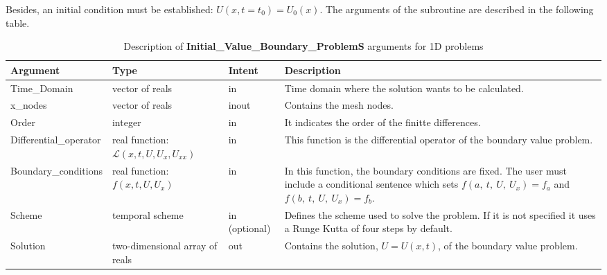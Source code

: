 Besides, an initial condition must be established: $U(x,t = t_0) = U_0 (x)$.
The arguments of the subroutine are described in the following table.

\begin{table}[H]
	\begin{center}
		\begin{spacing}{1.2}
			\begin{tabular}{| l | p{3cm}| l | p{5.5cm} |}
				
				\hline
				
				\bf Argument & \bf Type & \bf Intent & \bf Description \\ \hline \hline
				
				Time\_Domain & vector of reals & in &  Time domain where the solution wants to be calculated.  \\ \hline
				
				x\_nodes & vector of reals & inout &  Contains the mesh nodes.  \\ \hline
				
				Order &  integer  & in & It indicates the order of the finitte differences.  \\ \hline
				
				Differential\_operator & \raggedright real function: $\mathscr{L}\left(x, t, U,  U_x,  U_{xx} \right)$ & in  & This function is the differential operator of the boundary value problem.   \\ \hline
				
				Boundary\_conditions & \raggedright real function: $f\left(x, t, U,  U_x \right)$  & in &  In this function, the boundary conditions are fixed. The user must include a conditional sentence which sets $f\left(a, \ t, \ U, \ U_x \right) = f_a$ and $f\left(b,\ t, \ U, \ U_x \right) = f_b$.  \\ \hline
				
				Scheme & temporal scheme  & in (optional) & Defines the scheme used to solve the problem. If it is not specified it uses a Runge Kutta of four steps by default.    \\ \hline
				
				Solution & two-dimensional array of reals  & out &  Contains the solution, $U = U(x,t)$, of the boundary value problem. \\ \hline
				
				
			\end{tabular}
		\end{spacing}
	\end{center}
	\caption{Description of \textbf{Initial\_Value\_Boundary\_ProblemS} arguments for 1D problems}
\end{table}



